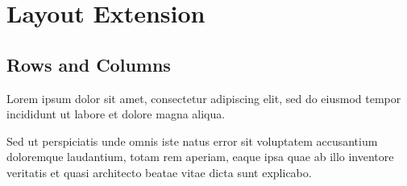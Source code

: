 
\chapter{\label{layout-extension}Layout Extension}
\section{\label{rows-and-columns}Rows and Columns}
\begin{minipage}[t]{0.6466666666666666\textwidth}

\par Lorem ipsum dolor sit amet, consectetur adipiscing elit, sed do eiusmod tempor incididunt ut labore et dolore magna aliqua.
\end{minipage}
\hfill
\begin{minipage}[t]{0.3133333333333333\textwidth}

\par Sed ut perspiciatis unde omnis iste natus error sit voluptatem accusantium doloremque laudantium, totam rem aperiam, eaque ipsa quae ab illo inventore veritatis et quasi architecto beatae vitae dicta sunt explicabo.
\end{minipage}


